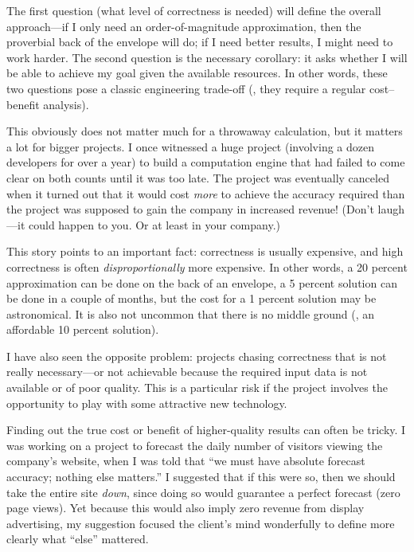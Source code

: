 The first question (what level of correctness is needed) will define
the overall approach---if I only need an order-of-magnitude
approximation, then the proverbial back of the envelope will do; if I
need better results, I might need to work harder. The second question
is the necessary corollary: it asks whether I will be able to achieve
my goal given the available resources. In other words, these two
questions pose a classic engineering trade-off (\ie, they require
a regular cost--benefit analysis).

\leaflong{12pt}
    
This obviously does not matter much for a throwaway calculation, but
it matters a lot for bigger projects.  I once witnessed a huge project
(involving a dozen developers for over a year) to build a computation
engine that had failed to come clear on both counts until it was too
late.  The project was eventually canceled when it turned out that it
would cost \emph{more} to achieve the accuracy required than the
project was supposed to gain the company in increased revenue! (Don't
laugh---it could happen to you.  Or at least in your company.)
    
This story points to an important fact: correctness is usually
expensive, and high correctness is often \emph{disproportionally} more
expensive.  In other words, a 20 percent approximation can be done on
the back of an envelope, a 5 percent solution can be done in a couple
of months, but the cost for a 1 percent solution may be astronomical.
It is also not uncommon that there is no middle ground (\eg, an
affordable 10 percent solution).

I have also seen the opposite problem: projects chasing correctness
that is not really necessary---or not achievable because the required
input data is not available or of poor quality. This is a particular
risk if  the project involves the opportunity to play with some
attractive new technology.
    
Finding out the true cost or benefit of higher-quality results can
often be tricky.  I was working on a project to forecast the daily
number of visitors viewing the company's website, when I was told that
``we must have absolute\vadjust{\pagebreak} forecast accuracy; nothing else matters.'' I
suggested that if this were so, then we should take the entire site
\emph{down}, since doing so would guarantee a perfect forecast (zero
page views). Yet because this would also imply zero revenue from
display advertising, my suggestion focused the client's mind
wonderfully to define more clearly what ``else'' mattered.


